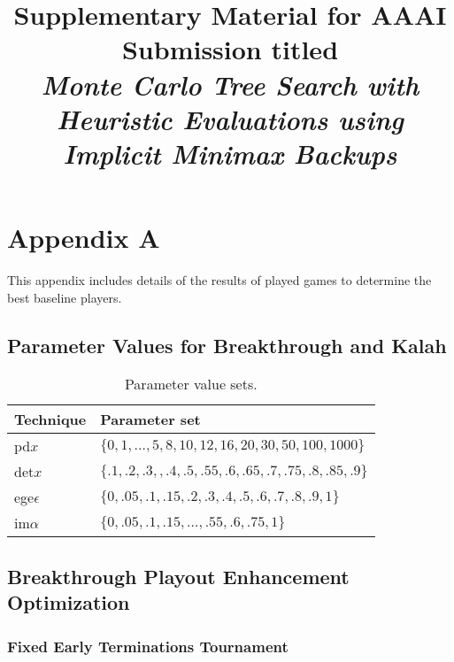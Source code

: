\documentclass{article}
\title{Supplementary Material for AAAI Submission titled\\{\it Monte Carlo Tree Search with Heuristic Evaluations using Implicit Minimax Backups}}
\author{}
\date{}
\begin{document}
\maketitle %

\section{Appendix A}

This appendix includes details of the results of played games to determine the best baseline players. 

\subsection{Parameter Values for Breakthrough and Kalah}

\begin{table}[h!]
\begin{center}
\begin{tabular}{|l|l|}
\hline
Technique & Parameter set \\
\hline
pd$x$          & $\{ 0, 1, \ldots, 5, 8, 10, 12, 16, 20, 30, 50, 100, 1000 \}$ \\
det$x$         & $\{ .1, .2, .3, , .4, .5, .55, .6, .65, .7, .75, .8, .85, .9 \}$ \\
ege$\epsilon$  & $\{ 0, .05, .1, .15, .2, .3, .4, .5, .6, .7, .8, .9, 1 \}$ \\
im$\alpha$     & $\{ 0, .05, .1, .15, \ldots, .55, .6, .75, 1 \}$ \\
\hline
\end{tabular}
\end{center}
\caption{Parameter value sets.}
\label{tbl:parmsets}
\end{table}

\subsection{Breakthrough Playout Enhancement Optimization}

\subsubsection{Fixed Early Terminations Tournament}
\end{document}
